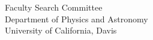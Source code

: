 \documentclass[12pt]{letter}
\begin{document}
\begin{letter}{
               Faculty Search Committee \\
               Department of Physics and Astronomy \\
               University of California, Davis 
           }


\end{letter}
\end{document}
